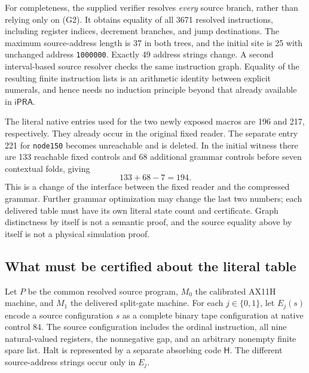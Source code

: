 For completeness, the supplied verifier resolves \emph{every} source
branch, rather than relying only on (G2).  It obtains equality of all
3671 resolved instructions, including register indices, decrement
branches, and jump destinations.  The maximum source-address length
is 37 in both trees, and the initial site is 25 with unchanged address
\texttt{1000000}.  Exactly 49 address strings change.  A second
interval-based source resolver checks the same instruction graph.
Equality of the resulting finite instruction lists is an arithmetic
identity between explicit numerals, and hence needs no induction
principle beyond that already available in $\mathsf{iPRA}$.

The literal native entries used for the two newly exposed macros are
196 and 217, respectively.  They already occur in the original fixed
reader.  The separate entry 221 for \texttt{node150} becomes unreachable
and is deleted.  In the initial witness there are 133 reachable fixed
controls and 68 additional grammar controls before seven contextual
folds, giving
\[
                         133+68-7=194.                         \tag{G3}
\]
This is a change of the interface between the fixed reader and the
compressed grammar.  Further grammar optimization may change the last
two numbers; each delivered table must have its own literal state
count and certificate.  Graph distinctness by itself is not a semantic
proof, and the source equality above by itself is not a physical
simulation proof.

\subsection{What must be certified about the literal table}

Let $P$ be the common resolved source program, $M_0$ the calibrated AX11H
machine, and $M_1$ the delivered split-gate machine.  For each $j\in
\{0,1\}$, let $E_j(s)$ encode a source configuration $s$ as a complete
binary tape configuration at native control 84.  The source
configuration includes the ordinal instruction, all nine natural-valued
registers, the nonnegative gap, and an arbitrary nonempty finite spare
list.  Halt is represented by a separate absorbing code $\mathsf H$.
The different source-address strings occur only in $E_j$.

